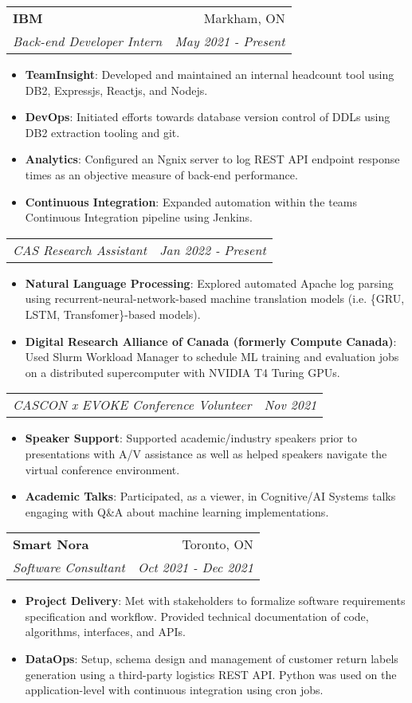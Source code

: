 \documentclass[letterpaper,11pt]{article}
\makeatletter
\newcommand{\resumeItem}[2]{
  \item\small{
    \textbf{#1}{: #2\vspace{-2pt}}
  }
}
\newcommand{\resumeSubheading}[4]{
  \vspace{-1pt}\item
    \begin{tabular*}{0.97\textwidth}[t]{l@{\extracolsep{\fill}}r}
      \textbf{\large#1} & #2 \\
      \textit{\small#3} & \textit{\small #4} \\
    \end{tabular*}\vspace{-5pt}
}
\newcommand{\resumeSubSubheading}[2]{
    \begin{tabular*}{0.97\textwidth}{l@{\extracolsep{\fill}}r}
      \textit{\small#1} & \textit{\small #2} \\
    \end{tabular*}\vspace{-5pt}
}
\newcommand{\resumeSubHeadingListEnd}{\end{itemize}}
\newcommand{\resumeItemListStart}{\begin{itemize}}
\newcommand{\resumeItemListEnd}{\end{itemize}\vspace{-5pt}}
\makeatother
\begin{document}
    \resumeSubheading
      {IBM}{Markham, ON}
      {Back-end Developer Intern}{May 2021 - Present}
      \resumeItemListStart
        \resumeItem{TeamInsight}
          {Developed and maintained an internal headcount tool using DB2, Expressjs, Reactjs, and Nodejs.}
        \resumeItem{DevOps}
          {Initiated efforts towards database version control of DDLs using DB2 extraction tooling and git.}
        \resumeItem{Analytics}
          {Configured an Ngnix server to log REST API endpoint response times as an objective measure of back-end performance.}
      	\resumeItem{Continuous Integration}
     	  {Expanded automation within the teams Continuous Integration pipeline using Jenkins.}
      \resumeItemListEnd
      \resumeSubSubheading
		{CAS Research Assistant}{Jan 2022 - Present}
		\resumeItemListStart
		\resumeItem{Natural Language Processing}
		{Explored automated Apache log parsing using recurrent-neural-network-based machine translation models (i.e. \{GRU, LSTM, Transfomer\}-based models).}
		\resumeItem{Digital Research Alliance of Canada (formerly Compute Canada)}
		{Used Slurm Workload Manager to schedule ML training and evaluation jobs on a distributed supercomputer with NVIDIA T4 Turing GPUs.}
		\resumeItemListEnd
      \resumeSubSubheading
		{CASCON x EVOKE Conference Volunteer}{Nov 2021}
		\resumeItemListStart
		\resumeItem{Speaker Support}
		{Supported academic/industry speakers prior to presentations with A/V assistance as well as helped speakers navigate the virtual conference environment.}
		\resumeItem{Academic Talks}
		{Participated, as a viewer, in Cognitive/AI Systems talks engaging with Q\&A about machine learning implementations.}
		
		\resumeItemListEnd
      
	\resumeSubheading
	{Smart Nora}{Toronto, ON}
	{Software Consultant}{Oct 2021 - Dec 2021}
	\resumeItemListStart
	\resumeItem{Project Delivery}
	{Met with stakeholders to formalize software requirements specification and workflow. Provided technical documentation of code, algorithms, interfaces, and APIs.}
	\resumeItem{DataOps}
	{Setup, schema design and management of customer return labels generation using a third-party logistics REST API. Python was used on the application-level with continuous integration using cron jobs.}
	\resumeItemListEnd
	
\end{document}
